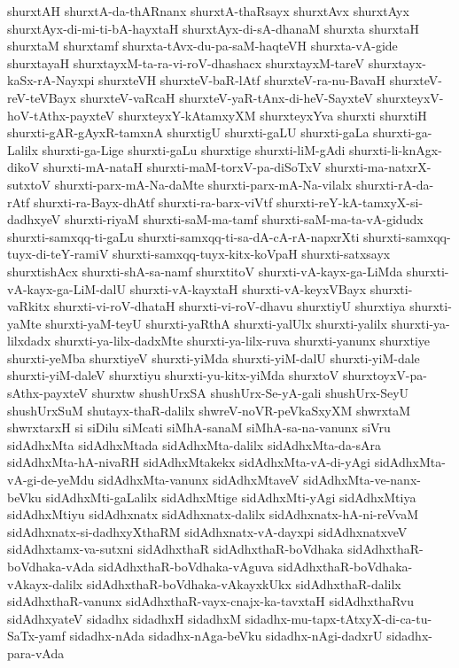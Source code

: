 {shurxtAH
shurxtA-da-thARnanx
shurxtA-thaRsayx
shurxtAvx
shurxtAyx
shurxtAyx-di-mi-ti-bA-hayxtaH
shurxtAyx-di-sA-dhanaM
shurxta
shurxtaH
shurxtaM
shurxtamf
shurxta-tAvx-du-pa-saM-haqteVH
shurxta-vA-gide
shurxtayaH
shurxtayxM-ta-ra-vi-roV-dhashacx
shurxtayxM-tareV
shurxtayx-kaSx-rA-Nayxpi
shurxteVH
shurxteV-baR-lAtf
shurxteV-ra-nu-BavaH
shurxteV-reV-teVBayx
shurxteV-vaRcaH
shurxteV-yaR-tAnx-di-heV-SayxteV
shurxteyxV-hoV-tAthx-payxteV
shurxteyxY-kAtamxyXM
shurxteyxYva
shurxti
shurxtiH
shurxti-gAR-gAyxR-tamxnA
shurxtigU
shurxti-gaLU
shurxti-gaLa
shurxti-ga-Lalilx
shurxti-ga-Lige
shurxti-gaLu
shurxtige
shurxti-liM-gAdi
shurxti-li-knAgx-dikoV
shurxti-mA-nataH
shurxti-maM-torxV-pa-diSoTxV
shurxti-ma-natxrX-sutxtoV
shurxti-parx-mA-Na-daMte
shurxti-parx-mA-Na-vilalx
shurxti-rA-da-rAtf
shurxti-ra-Bayx-dhAtf
shurxti-ra-barx-viVtf
shurxti-reY-kA-tamxyX-si-dadhxyeV
shurxti-riyaM
shurxti-saM-ma-tamf
shurxti-saM-ma-ta-vA-gidudx
shurxti-samxqq-ti-gaLu
shurxti-samxqq-ti-sa-dA-cA-rA-napxrXti
shurxti-samxqq-tuyx-di-teY-ramiV
shurxti-samxqq-tuyx-kitx-koVpaH
shurxti-satxsayx
shurxtishAcx
shurxti-shA-sa-namf
shurxtitoV
shurxti-vA-kayx-ga-LiMda
shurxti-vA-kayx-ga-LiM-dalU
shurxti-vA-kayxtaH
shurxti-vA-keyxVBayx
shurxti-vaRkitx
shurxti-vi-roV-dhataH
shurxti-vi-roV-dhavu
shurxtiyU
shurxtiya
shurxti-yaMte
shurxti-yaM-teyU
shurxti-yaRthA
shurxti-yalUlx
shurxti-yalilx
shurxti-ya-lilxdadx
shurxti-ya-lilx-dadxMte
shurxti-ya-lilx-ruva
shurxti-yanunx
shurxtiye
shurxti-yeMba
shurxtiyeV
shurxti-yiMda
shurxti-yiM-dalU
shurxti-yiM-dale
shurxti-yiM-daleV
shurxtiyu
shurxti-yu-kitx-yiMda
shurxtoV
shurxtoyxV-pa-sAthx-payxteV
shurxtw
shushUrxSA
shushUrx-Se-yA-gali
shushUrx-SeyU
shushUrxSuM
shutayx-thaR-dalilx
shwreV-noVR-peVkaSxyXM
shwrxtaM
shwrxtarxH
si
siDilu
siMcati
siMhA-sanaM
siMhA-sa-na-vanunx
siVru
sidAdhxMta
sidAdhxMtada
sidAdhxMta-dalilx
sidAdhxMta-da-sAra
sidAdhxMta-hA-nivaRH
sidAdhxMtakekx
sidAdhxMta-vA-di-yAgi
sidAdhxMta-vA-gi-de-yeMdu
sidAdhxMta-vanunx
sidAdhxMtaveV
sidAdhxMta-ve-nanx-beVku
sidAdhxMti-gaLalilx
sidAdhxMtige
sidAdhxMti-yAgi
sidAdhxMtiya
sidAdhxMtiyu
sidAdhxnatx
sidAdhxnatx-dalilx
sidAdhxnatx-hA-ni-reVvaM
sidAdhxnatx-si-dadhxyXthaRM
sidAdhxnatx-vA-dayxpi
sidAdhxnatxveV
sidAdhxtamx-va-sutxni
sidAdhxthaR
sidAdhxthaR-boVdhaka
sidAdhxthaR-boVdhaka-vAda
sidAdhxthaR-boVdhaka-vAguva
sidAdhxthaR-boVdhaka-vAkayx-dalilx
sidAdhxthaR-boVdhaka-vAkayxkUkx
sidAdhxthaR-dalilx
sidAdhxthaR-vanunx
sidAdhxthaR-vayx-cnajx-ka-tavxtaH
sidAdhxthaRvu
sidAdhxyateV
sidadhx
sidadhxH
sidadhxM
sidadhx-mu-tapx-tAtxyX-di-ca-tu-SaTx-yamf
sidadhx-nAda
sidadhx-nAga-beVku
sidadhx-nAgi-dadxrU
sidadhx-para-vAda
}
